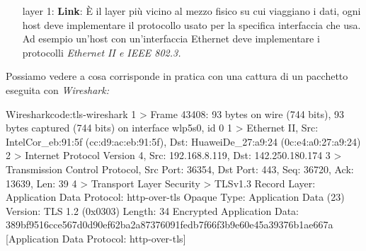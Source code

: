 \begin{enumerate}

    \item[layer 1:] \textbf{Link}: È il layer più vicino al mezzo fisico su cui viaggiano i dati, ogni host deve implementare il protocollo usato per la specifica interfaccia che usa. Ad esempio un'host con un'interfaccia Ethernet deve implementare i protocolli \it{Ethernet II} e \it{IEEE 802.3}.

\end{enumerate}

Possiamo vedere a cosa corrisponde in pratica con una cattura di un pacchetto eseguita con \it{Wireshark}:

\begin{bashcode}{Wireshark}{code:tls-wireshark}
1 > Frame 43408: 93 bytes on wire (744 bits), 93 bytes captured (744 bits) on interface wlp5s0, id 0
1 > Ethernet II, Src: IntelCor_eb:91:5f (cc:d9:ac:eb:91:5f), Dst: HuaweiDe_27:a9:24 (0c:e4:a0:27:a9:24)
2 > Internet Protocol Version 4, Src: 192.168.8.119, Dst: 142.250.180.174
3 > Transmission Control Protocol, Src Port: 36354, Dst Port: 443, Seq: 36720, Ack: 13639, Len: 39
4 > Transport Layer Security
> TLSv1.3 Record Layer: Application Data Protocol: http-over-tls
Opaque Type: Application Data (23)
Version: TLS 1.2 (0x0303)
Length: 34
Encrypted Application Data: 389bf9516cce567d0d90ef62ba2a87376091fedb7f66f3b9e60e45a39376b1ae667a
    [Application Data Protocol: http-over-tls]
\end{bashcode}

